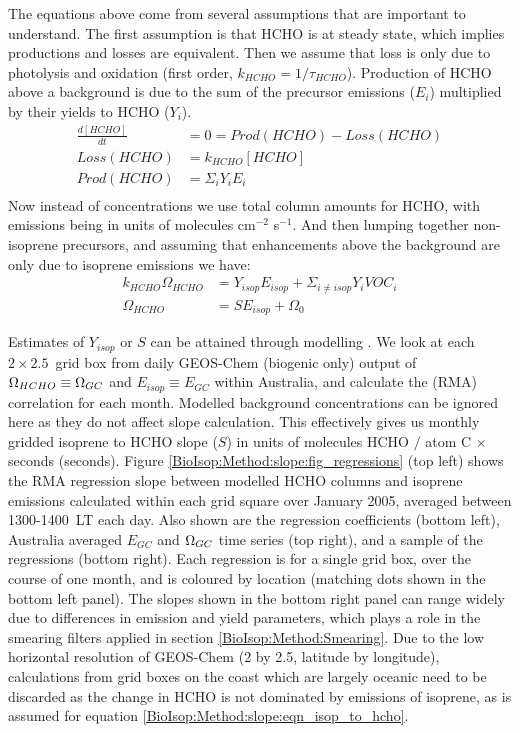     The equations above come from several assumptions that are important to understand.
    The first assumption is that HCHO %
    is at steady state, which implies productions and losses are equivalent.
    Then we assume that loss is only due to photolysis and oxidation (first order, $k_{HCHO} = 1/\tau_{HCHO}$).
    Production of HCHO above a background is due to the sum of the precursor emissions ($E_i$) multiplied by their yields to HCHO ($Y_i$).
    \begin{eqnarray*}
      \frac{d [ HCHO ] }{dt} & = 0 = Prod(HCHO) - Loss(HCHO) \\
      Loss(HCHO)  & = k_{HCHO} [ HCHO ] \\
      Prod(HCHO)  & = \Sigma_i Y_i E_i  \\
    \end{eqnarray*}
    Now instead of concentrations we use total column amounts for HCHO, with emissions being in units of molecules cm$^{-2}$ s$^{-1}$.
    And then lumping together non-isoprene precursors, and assuming that enhancements above the background are only due to isoprene emissions we have: 
    \begin{eqnarray*}
    k_{HCHO} \Omega_{HCHO} & = Y_{isop} E_{isop} + \Sigma_{i \ne isop} Y_{i} VOC_{i} \\
    \Omega_{HCHO} & = S E_{isop} + \Omega_{0}
    \end{eqnarray*}
    
    
    Estimates of $Y_{isop}$ or $S$ can be attained through modelling \parencite[e.g.][]{Millet2006}.
    We look at each $2\times2.5$~\degr grid box from daily GEOS-Chem (biogenic only) output of $\Omega_{HCHO} \equiv \Omega_{GC}$ and $E_{isop} \equiv E_{GC}$ within Australia, and calculate the (RMA) correlation for each month.
    Modelled background concentrations can be ignored here as they do not affect slope calculation.
    This effectively gives us monthly gridded isoprene to HCHO slope ($S$) in units of molecules HCHO $/$ atom C $\times$ seconds (seconds).
    Figure \ref{BioIsop:Method:slope:fig_regressions} (top left) shows the RMA regression slope between modelled HCHO columns and isoprene emissions calculated within each grid square over January 2005, averaged between 1300-1400~LT each day.
    Also shown are the regression coefficients (bottom left), Australia averaged $E_{GC}$ and $\Omega_{GC}$ time series (top right), and a sample of the regressions (bottom right).
    Each regression is for a single grid box, over the course of one month, and is coloured by location (matching dots shown in the bottom left panel).
    The slopes shown in the bottom right panel can range widely due to differences in emission and yield parameters, which plays a role in the smearing filters applied in section \ref{BioIsop:Method:Smearing}.
    Due to the low horizontal resolution of GEOS-Chem (2 by 2.5\degr, latitude by longitude), calculations from grid boxes on the coast which are largely oceanic need to be discarded as the change in HCHO is not dominated by emissions of isoprene, as is assumed for equation \ref{BioIsop:Method:slope:eqn_isop_to_hcho}.
    
